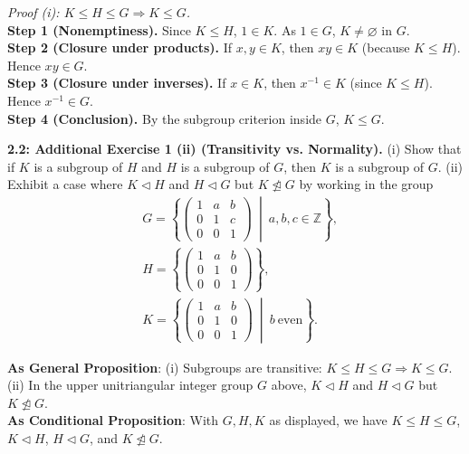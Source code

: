 \documentclass[12pt]{article}
\theoremstyle{definition}
\begin{document}
\dotfill

\emph{Proof (i): $K\le H\le G\Rightarrow K\le G$.}\\
\textbf{Step 1 (Nonemptiness).} Since $K\le H$, $1\in K$. As $1\in G$, $K\neq\varnothing$ in $G$.\\
\textbf{Step 2 (Closure under products).} If $x,y\in K$, then $xy\in K$ (because $K\le H$). Hence $xy\in G$.\\
\textbf{Step 3 (Closure under inverses).} If $x\in K$, then $x^{-1}\in K$ (since $K\le H$). Hence $x^{-1}\in G$.\\
\textbf{Step 4 (Conclusion).} By the subgroup criterion inside $G$, $K\le G$.\\

\newpage

\newpage

\noindent \textbf{2.2: Additional Exercise 1 (ii) (Transitivity vs. Normality).} 
(i) Show that if $K$ is a subgroup of $H$ and $H$ is a subgroup of $G$, then $K$ is a subgroup of $G$. 
(ii) Exhibit a case where $K\lhd H$ and $H\lhd G$ but $K\ntrianglelefteq G$ by working in the group
\begin{align*}
&G=\left\{\begin{pmatrix}
1 & a & b\\
0 & 1 & c\\
0 & 0 & 1
\end{pmatrix}\ \middle|\ a,b,c\in\mathbb Z\right\},
\\
&H=\left\{\begin{pmatrix}
1 & a & b\\
0 & 1 & 0\\
0 & 0 & 1
\end{pmatrix}\right\},
\\
&K=\left\{\begin{pmatrix}
1 & a & b\\
0 & 1 & 0\\
0 & 0 & 1
\end{pmatrix}\ \middle|\ b\ \text{even}\right\}.
\end{align*}%

\noindent\textbf{As General Proposition}: (i) Subgroups are transitive: $K\le H\le G\Rightarrow K\le G$. 
(ii) In the upper unitriangular integer group $G$ above, $K\lhd H$ and $H\lhd G$ but $K\ntrianglelefteq G$.\\

\noindent \textbf{As Conditional Proposition}: With $G,H,K$ as displayed, we have $K\le H\le G$, $K\lhd H$, $H\lhd G$, and $K\ntrianglelefteq G$.
\end{document}
